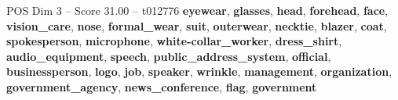 \begin{textsample}{POS Dim 3 – Score 31.00 – t012776}  \label{ex:f3_pos_023}
\textbf{eyewear}, \textbf{glasses}, \textbf{head}, \textbf{forehead}, \textbf{face}, \textbf{vision\_care}, \textbf{nose}, \textbf{formal\_wear}, \textbf{suit}, \textbf{outerwear}, \textbf{necktie}, \textbf{blazer}, \textbf{coat}, \textbf{spokesperson}, \textbf{microphone}, \textbf{white-collar\_worker}, \textbf{dress\_shirt}, \textbf{audio\_equipment}, \textbf{speech}, \textbf{public\_address\_system}, \textbf{official}, \textbf{businessperson}, \textbf{logo}, \textbf{job}, \textbf{speaker}, \textbf{wrinkle}, \textbf{management}, \textbf{organization}, \textbf{government\_agency}, \textbf{news\_conference}, \textbf{flag}, \textbf{government}

\end{textsample}
